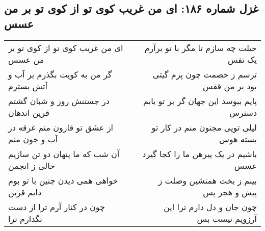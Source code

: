 \begin{center}
\section*{غزل شماره ۱۸۶: ای من غریب کوی تو از کوی تو بر من عسس}
\label{sec:186}
\begin{longtable}{l p{0.5cm} r}
ای من غریب کوی تو از کوی تو بر من عسس
&&
حیلت چه سازم تا مگر با تو برآرم یک نفس
\\
گر من به کویت بگذرم بر آب و آتش بسترم
&&
ترسم ز خصمت چون پرم گیتی بود بر من قفس
\\
در جستنش روز و شبان گشتم قرین اندهان
&&
پایم ببوسد این جهان گر بر تو یابم دسترس
\\
از عشق تو قارون منم غرقه در آب و خون منم
&&
لیلی تویی مجنون منم در کار تو بسته هوس
\\
آن شب که ما پنهان دو تن سازیم حالی ز انجمن
&&
باشیم در یک پیرهن ما را کجا گیرد عسس
\\
خواهی همی دیدن چنین با تو بوم دایم قرین
&&
بینم ز بخت همنشین وصلت ز پیش و هجر پس
\\
چون در کنار آرم ترا از دست نگذارم ترا
&&
چون جان و دل دارم ترا این آرزویم نیست بس
\\
\end{longtable}
\end{center}
